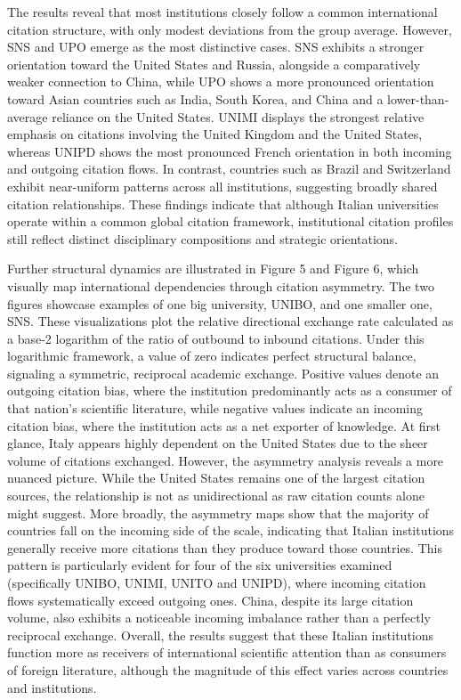 \documentclass[year=2026]{cup-journal}
\begin{document}
The results reveal that most institutions closely follow a common international citation structure, with only modest deviations from the group average. However, SNS and UPO emerge as the most distinctive cases. SNS exhibits a stronger orientation toward the United States and Russia, alongside a comparatively weaker connection to China, while UPO shows a more pronounced orientation toward Asian countries such as India, South Korea, and China and a lower-than-average reliance on the United States. UNIMI displays the strongest relative emphasis on citations involving the United Kingdom and the United States, whereas UNIPD shows the most pronounced French orientation in both incoming and outgoing citation flows. In contrast, countries such as Brazil and Switzerland exhibit near-uniform patterns across all institutions, suggesting broadly shared citation relationships. These findings indicate that although Italian universities operate within a common global citation framework, institutional citation profiles still reflect distinct disciplinary compositions and strategic orientations.

Further structural dynamics are illustrated in Figure 5 and Figure 6, which visually map international dependencies through citation asymmetry. The two figures showcase examples of one big university, UNIBO, and one smaller one, SNS. These visualizations plot the relative directional exchange rate calculated as a base-2 logarithm of the ratio of outbound to inbound citations. Under this logarithmic framework, a value of zero indicates perfect structural balance, signaling a symmetric, reciprocal academic exchange. Positive values denote an outgoing citation bias, where the institution predominantly acts as a consumer of that nation’s scientific literature, while negative values indicate an incoming citation bias, where the institution acts as a net exporter of knowledge. At first glance, Italy appears highly dependent on the United States due to the sheer volume of citations exchanged. However, the asymmetry analysis reveals a more nuanced picture. While the United States remains one of the largest citation sources, the relationship is not as unidirectional as raw citation counts alone might suggest. More broadly, the asymmetry maps show that the majority of countries fall on the incoming side of the scale, indicating that Italian institutions generally receive more citations than they produce toward those countries. This pattern is particularly evident for four of the six universities examined (specifically UNIBO, UNIMI, UNITO and UNIPD), where incoming citation flows systematically exceed outgoing ones. China, despite its large citation volume, also exhibits a noticeable incoming imbalance rather than a perfectly reciprocal exchange. Overall, the results suggest that these Italian institutions function more as receivers of international scientific attention than as consumers of foreign literature, although the magnitude of this effect varies across countries and institutions.
\end{document}
